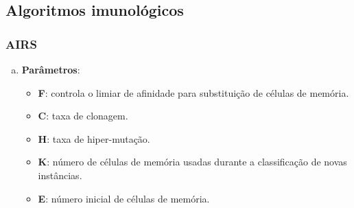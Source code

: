 \subsection{Algoritmos imunológicos}

\subsubsection{AIRS}

\begin{enumerate}[a)]
    \item \textbf{Parâmetros}:
        \begin{itemize}

        \item \textbf{F}: controla o limiar de afinidade para substituição de células de memória.

        \item \textbf{C}: taxa de clonagem.

        \item \textbf{H}: taxa de hiper-mutação.

        \item \textbf{K}: número de células de memória usadas durante a classificação de novas instâncias.

        \item \textbf{E}: número inicial de células de memória.

\end{itemize}
\end{enumerate}
